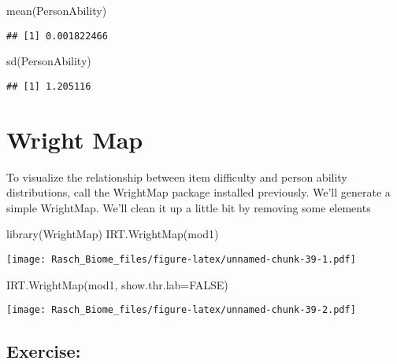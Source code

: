 \documentclass[
]{book}
\newenvironment{Shaded}{\begin{snugshade}}{\end{snugshade}}
\newcommand{\AttributeTok}[1]{\textcolor[rgb]{0.77,0.63,0.00}{#1}}
\newcommand{\ConstantTok}[1]{\textcolor[rgb]{0.00,0.00,0.00}{#1}}
\newcommand{\FunctionTok}[1]{\textcolor[rgb]{0.00,0.00,0.00}{#1}}
\newcommand{\NormalTok}[1]{#1}
\begin{document}
\begin{Shaded}
\begin{Highlighting}[]
\FunctionTok{mean}\NormalTok{(PersonAbility)}
\end{Highlighting}
\end{Shaded}

\begin{verbatim}
## [1] 0.001822466
\end{verbatim}

\begin{Shaded}
\begin{Highlighting}[]
\FunctionTok{sd}\NormalTok{(PersonAbility)}
\end{Highlighting}
\end{Shaded}

\begin{verbatim}
## [1] 1.205116
\end{verbatim}

\hypertarget{wright-map}{%
\section{Wright Map}\label{wright-map}}

To visualize the relationship between item difficulty and person ability distributions, call the WrightMap package installed previously. We'll generate a simple WrightMap. We'll clean it up a little bit by removing some elements

\begin{Shaded}
\begin{Highlighting}[]
\FunctionTok{library}\NormalTok{(WrightMap)}
\FunctionTok{IRT.WrightMap}\NormalTok{(mod1)}
\end{Highlighting}
\end{Shaded}

\texttt{[image: Rasch\_Biome\_files/figure-latex/unnamed-chunk-39-1.pdf]}

\begin{Shaded}
\begin{Highlighting}[]
\FunctionTok{IRT.WrightMap}\NormalTok{(mod1, }\AttributeTok{show.thr.lab=}\ConstantTok{FALSE}\NormalTok{)}
\end{Highlighting}
\end{Shaded}

\texttt{[image: Rasch\_Biome\_files/figure-latex/unnamed-chunk-39-2.pdf]}

\hypertarget{exercise-2}{%
\subsection{Exercise:}\label{exercise-2}}
\end{document}
